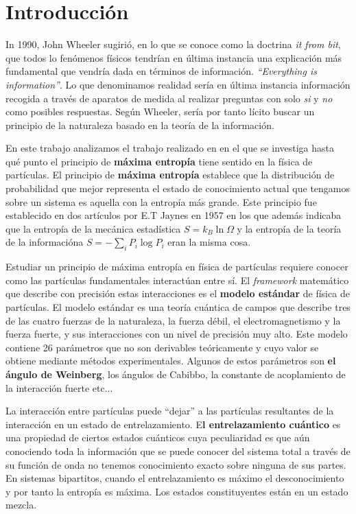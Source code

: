 \documentclass{article}
\theoremstyle{plain}
\theoremstyle{definition}
\begin{document}
	\section{Introducción}
	In 1990, John Wheeler sugirió, en lo que se conoce como la doctrina \textit{it from bit}, que todos lo fenómenos físicos tendrían en última instancia una explicación más fundamental que vendría dada en términos de información. \textit{``Everything is information''}. Lo que denominamos realidad sería en última instancia información recogida  a través de aparatos de medida al realizar preguntas con solo \textit{si} y \textit{no} como posibles respuestas.  Según Wheeler, sería por tanto lícito buscar un principio de la naturaleza basado en la teoría de la información. \par En este trabajo analizamos el trabajo realizado en \cite{Cervera-Lierta:2017tdt} en el que se investiga hasta qué punto el principio de \textbf{máxima entropía} tiene sentido en la física de partículas. 
	El principio de \textbf{máxima entropía} establece que la distribución de probabilidad que mejor representa el estado de conocimiento actual que tengamos sobre un sistema es aquella con la entropía más grande. Este principio fue establecido en dos artículos por E.T Jaynes en 1957 en los que además indicaba que la entropía de la mecánica estadística \(S = k_B \ln\Omega \) y la entropía de la teoría de la informacióna \cite{Shannon1948} \( S = -\sum_{i}P_i\log P_i\) eran la misma cosa.\par
	Estudiar un principio de máxima entropía en física de partículas requiere conocer como las partículas fundamentales interactúan entre sí. El \textit{framework}  matemático que describe con precisión estas interacciones es el \textbf{modelo estándar} de física de partículas. El modelo estándar \cite{Oerter:2006iy} es una teoría cuántica de campos que describe tres de las cuatro fuerzas de la naturaleza, la fuerza débil, el electromagnetismo y la fuerza fuerte, y sus interacciones con un nivel de precisión muy alto. Este modelo contiene 26 parámetros que no son derivables teóricamente y cuyo valor se obtiene mediante métodos experimentales. Algunos de estos parámetros son \textbf{el ángulo de Weinberg}, los ángulos de Cabibbo, la constante de acoplamiento de la interacción fuerte etc...\par
	La interacción entre partículas puede  ``dejar''  a las partículas resultantes de la interacción en un estado de entrelazamiento. E\textbf{l entrelazamiento cuántico} es una propiedad de ciertos estados cuánticos  cuya peculiaridad es que aún conociendo toda la información que se puede conocer del sistema total a través de su función de onda no  tenemos conocimiento exacto sobre ninguna de sus partes. En sistemas bipartitos, cuando el entrelazamiento es máximo el desconocimiento y por tanto la entropía es máxima. Los estados constituyentes están en un estado mezcla. \par 
\end{document}
